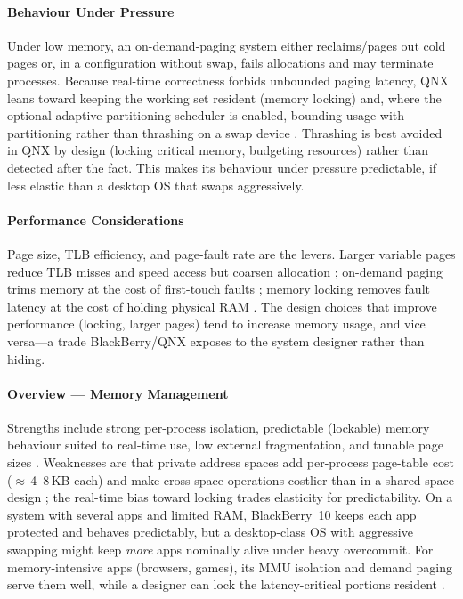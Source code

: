 \paragraph{Behaviour Under Pressure}

Under low memory, an on-demand-paging system either reclaims/pages out
cold pages or, in a configuration without swap, fails allocations and
may terminate processes. Because real-time correctness forbids
unbounded paging latency, QNX leans toward keeping the working set
resident (memory locking) and, where the optional adaptive partitioning
scheduler is enabled, bounding usage with partitioning rather than
thrashing on a swap device \citep{qnx_memman, qnx_aps}. Thrashing
is best avoided in QNX by design (locking critical memory, budgeting
resources) rather than detected after the fact. This makes its
behaviour under pressure predictable, if less elastic than a desktop OS
that swaps aggressively.

\paragraph{Performance Considerations}

Page size, TLB efficiency, and page-fault rate are the levers. Larger
variable pages reduce TLB misses and speed access but coarsen
allocation \citep{qnx_memman}; on-demand paging trims memory at the
cost of first-touch faults \citep{membarrier_qnx8_mem}; memory locking
removes fault latency at the cost of holding physical RAM
\citep{qnx_memman}. The design choices that improve performance
(locking, larger pages) tend to increase memory usage, and vice
versa---a trade BlackBerry/QNX exposes to the system designer rather
than hiding.

\paragraph{Overview --- Memory Management}

Strengths include strong per-process isolation, predictable (lockable)
memory behaviour suited to real-time use, low external fragmentation,
and tunable page sizes \citep{qnx_memman, membarrier_qnx8_mem}.
Weaknesses are that private address spaces add per-process page-table
cost ($\approx$\,4--8\,KB each) and make cross-space operations
costlier than in a shared-space design \citep{qnx_memman}; the
real-time bias toward locking trades elasticity for predictability. On
a system with several apps and limited RAM, BlackBerry~10 keeps each
app protected and behaves predictably, but a desktop-class OS with
aggressive swapping might keep \emph{more} apps nominally alive under
heavy overcommit. For memory-intensive apps (browsers, games), its MMU
isolation and demand paging serve them well, while a designer can lock
the latency-critical portions resident \citep{qnx_memman}.
